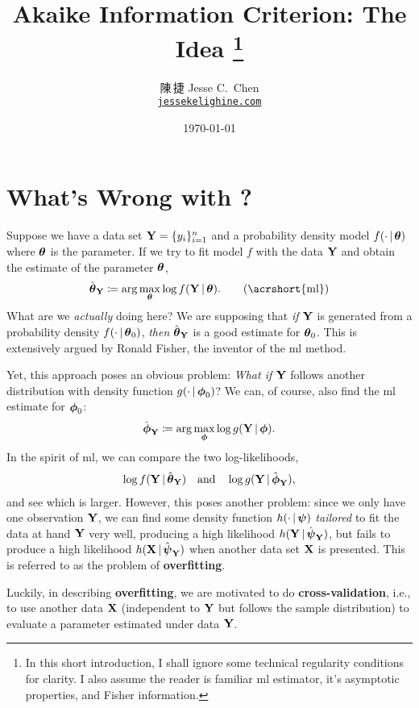 \documentclass[a4paper]{article}
\title{Akaike Information Criterion: The Idea%
\footnote{In this short introduction, I shall ignore some technical regularity conditions for clarity.
I also assume the reader is familiar \acrshort{ml} estimator, it's asymptotic properties, and Fisher information.}}
\author{陳\,捷 Jesse C.\ Chen\\\texttt{\href{https://jessekelighine.com}{jessekelighine.com}}}
\date{\today}
\begin{document}
\maketitle

\section{What's Wrong with ?}

\noindent
Suppose we have a data set $\mathbf{Y}=\{y_{i}\}_{i=1}^n$ and a probability density model $f(\cdot\,|\,\boldsymbol{\theta})$ where $\boldsymbol{\theta}$ is the parameter.
If we try to fit model $f$ with the data $\mathbf{Y}$ and obtain the estimate of the parameter $\boldsymbol{\theta}$,
\begin{align}
	\hat\ttheta_{\YY} \coloneqq \arg\max_{\ttheta} \log f(\YY\given\ttheta). \tag{\acrshort{ml}}
\end{align}
What are we \emph{actually} doing here?
We are supposing that \emph{if} $\mathbf{Y}$ is generated from a probability density $f(\cdot\,|\,\boldsymbol{\theta}_{0})$,
\emph{then} $\hat{\boldsymbol{\theta}}_{\mathbf{Y}}$ is a good estimate for $\boldsymbol{\theta}_{0}$.
This is extensively argued by Ronald Fisher, the inventor of the \gls{ml} method.

Yet, this approach poses an obvious problem:
\emph{What if} $\mathbf{Y}$ follows another distribution with density function $g(\cdot\,|\,\boldsymbol{\phi}_{0})$?
We can, of course, also find the \gls{ml} estimate for $\boldsymbol{\phi}_{0}$:
\begin{align*}
	\hat{\boldsymbol{\phi}}_{\mathbf{Y}} \coloneqq \arg\max_{\boldsymbol{\phi}} \log g(\mathbf{Y}\,|\,\boldsymbol{\phi}).
\end{align*}
In the spirit of \gls{ml},
we can compare the two log-likelihoods,
\begin{align}\label{eq:ml-compare}
	\log f(\mathbf{Y}\,|\,\hat{\boldsymbol{\theta}}_{\mathbf{Y}})
	\quad\text{and}\quad
	\log g(\mathbf{Y}\,|\,\hat{\boldsymbol{\phi}}_{\mathbf{Y}}),
\end{align}
and see which is larger.
However, this poses another problem:
since we only have one observation $\mathbf{Y}$,
we can find some density function $h(\cdot\,|\,\boldsymbol{\psi})$ \emph{tailored} to fit the data at hand $\mathbf{Y}$ very well,
producing a high likelihood $h(\mathbf{Y}\,|\,\hat{\boldsymbol{\psi}}_{\mathbf{Y}})$,
but fails to produce a high likelihood $h(\mathbf{X}\,|\,\hat{\boldsymbol{\psi}}_{\mathbf{Y}})$ when another data set $\mathbf{X}$ is presented.
This is referred to as the problem of \textbf{overfitting}.

Luckily,
in describing \textbf{overfitting},
we are motivated to do \textbf{cross-validation},
i.e., to use another data $\mathbf{X}$ (independent to $\mathbf{Y}$ but follows the sample distribution)
to evaluate a parameter estimated under data $\mathbf{Y}$.
\end{document}
